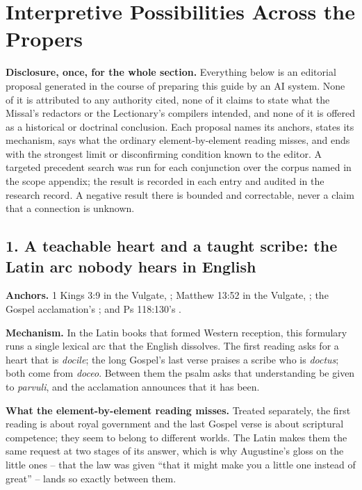 \section*{Interpretive Possibilities Across the Propers}

\textbf{Disclosure, once, for the whole section.} Everything below is an editorial proposal generated in the course of preparing this guide by an AI system. None of it is attributed to any authority cited, none of it claims to state what the Missal's redactors or the Lectionary's compilers intended, and none of it is offered as a historical or doctrinal conclusion. Each proposal names its anchors, states its mechanism, says what the ordinary element-by-element reading misses, and ends with the strongest limit or disconfirming condition known to the editor. A targeted precedent search was run for each conjunction over the corpus named in the scope appendix; the result is recorded in each entry and audited in the research record. A negative result there is bounded and correctable, never a claim that a connection is unknown.

\subsection*{1. A teachable heart and a taught scribe: the Latin arc nobody hears in English}

\textbf{Anchors.} 1 Kings 3:9 in the Vulgate, ; Matthew 13:52 in the Vulgate, ; the Gospel acclamation's ; and Ps 118:130's .

\textbf{Mechanism.} In the Latin books that formed Western reception, this formulary runs a single lexical arc that the English dissolves. The first reading asks for a heart that is \emph{docile}; the long Gospel's last verse praises a scribe who is \emph{doctus}; both come from \emph{doceo}. Between them the psalm asks that understanding be given to \emph{parvuli}, and the acclamation announces that it has been.

\textbf{What the element-by-element reading misses.} Treated separately, the first reading is about royal government and the last Gospel verse is about scriptural competence; they seem to belong to different worlds. The Latin makes them the same request at two stages of its answer, which is why Augustine's gloss on the little ones -- that the law was given ``that it might make you a little one instead of great'' -- lands so exactly between them.

